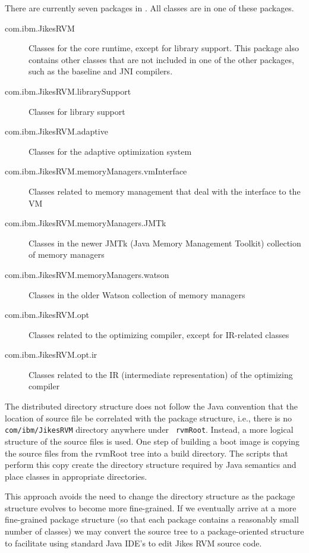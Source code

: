 There are currently seven packages in \jrvm. All classes are in
one of these packages.
\begin{description}
\item [com.ibm.JikesRVM] Classes for the core runtime, except for library
support.  This package also contains other classes that are not
included in one of the other packages, such as the baseline and JNI
compilers. 

\item [com.ibm.JikesRVM.librarySupport] Classes for library support
\item [com.ibm.JikesRVM.adaptive] Classes for the adaptive optimization system

\item [com.ibm.JikesRVM.memoryManagers.vmInterface] Classes related to
memory management that deal with the interface to the VM

\item [com.ibm.JikesRVM.memoryManagers.JMTk] Classes in the newer JMTk
(Java Memory Management Toolkit) collection of memory managers

\item [com.ibm.JikesRVM.memoryManagers.watson] Classes in the older
Watson collection of memory managers

\item [com.ibm.JikesRVM.opt] Classes related to the optimizing
compiler, except for IR-related classes

\item [com.ibm.JikesRVM.opt.ir] Classes related to the IR
(intermediate representation) of the optimizing compiler
\end{description}

The distributed directory structure
does not follow the Java convention that the location of source file
be correlated with the package structure, i.e.,
there is no {\tt com/ibm/JikesRVM} directory anywhere under {\tt
rvmRoot}.  Instead, a more logical structure of the source
files is used.  One step of building a boot image
is copying the source files from the rvmRoot tree into a build
directory.  The scripts that perform this copy create the directory
structure required by Java semantics and place classes in appropriate
directories.

This approach avoids the need to change the directory structure as the
package structure evolves to become more fine-grained. If we
eventually arrive at a more fine-grained package structure (so that
each package contains a reasonably small number of classes) we may
convert the source tree to a package-oriented structure to facilitate
using standard Java IDE's to edit Jikes RVM source code.
